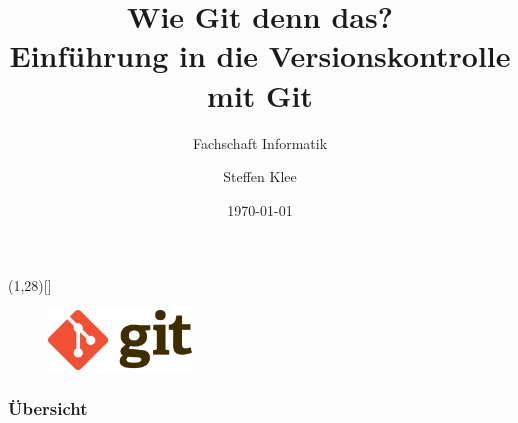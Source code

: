 \documentclass[accentcolor=tud8b,colorbacktitle,inverttitle,landscape,german,presentation,t]{tudbeamer}
\begin{document}
\title[Git-Workshop]{Wie Git denn das?\\Einführung in die Versionskontrolle mit Git}
\subtitle{Fachschaft Informatik}

\author[Steffen Klee]{Steffen Klee}


\date{\today}



\begin{titleframe}
	\makebox(1,28)[]{}
	\begin{figure}[ht]
	\centering
  	\includegraphics[height=60px]{git_logo}
	\end{figure}
\end{titleframe}

\begin{frame}
\frametitle{Übersicht}
\tableofcontents
\end{frame}
\end{document}

